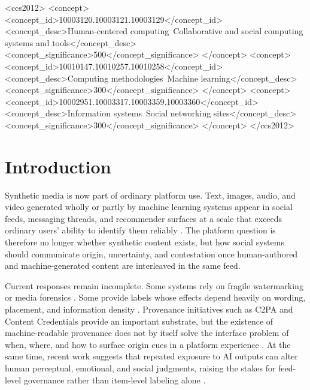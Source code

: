 \documentclass[acmlarge,screen,nonacm]{acmart}
\begin{document}
\begin{CCSXML}
<ccs2012>
   <concept>
       <concept_id>10003120.10003121.10003129</concept_id>
       <concept_desc>Human-centered computing~Collaborative and social computing systems and tools</concept_desc>
       <concept_significance>500</concept_significance>
   </concept>
   <concept>
       <concept_id>10010147.10010257.10010258</concept_id>
       <concept_desc>Computing methodologies~Machine learning</concept_desc>
       <concept_significance>300</concept_significance>
   </concept>
   <concept>
       <concept_id>10002951.10003317.10003359.10003360</concept_id>
       <concept_desc>Information systems~Social networking sites</concept_desc>
       <concept_significance>300</concept_significance>
   </concept>
</ccs2012>
\end{CCSXML}



\maketitle

\section{Introduction}

Synthetic media is now part of ordinary platform use. Text, images, audio, and video generated wholly or partly by machine learning systems appear in social feeds, messaging threads, and recommender surfaces at a scale that exceeds ordinary users' ability to identify them reliably \cite{lazer2018sciencefake, vosoughi2018spread, tolosana2020deepfakes}. The platform question is therefore no longer whether synthetic content exists, but how social systems should communicate origin, uncertainty, and contestation once human-authored and machine-generated content are interleaved in the same feed.

Current responses remain incomplete. Some systems rely on fragile watermarking or media forensics \cite{kirchenbauer2023watermark}. Some provide labels whose effects depend heavily on wording, placement, and information density \cite{aslett2022labels, li2024aigclabels, wittenberg2025labeling, gamage2025labeling}. Provenance initiatives such as C2PA and Content Credentials provide an important substrate, but the existence of machine-readable provenance does not by itself solve the interface problem of when, where, and how to surface origin cues in a platform experience \cite{c2pa2025spec, cai2026howitworks}. At the same time, recent work suggests that repeated exposure to AI outputs can alter human perceptual, emotional, and social judgments, raising the stakes for feed-level governance rather than item-level labeling alone \cite{glickman2025feedback}.
\end{document}
